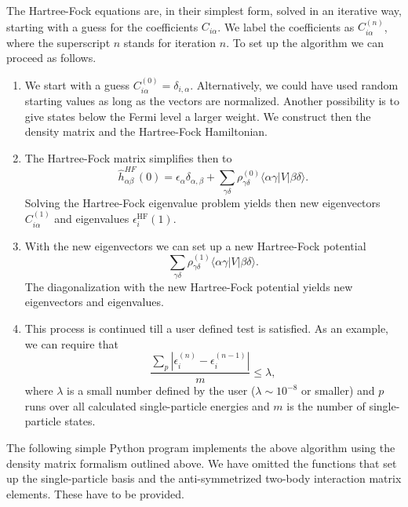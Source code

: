 The Hartree-Fock equations are, in their simplest form, solved in an
iterative way, starting with a guess for the coefficients
$C_{i\alpha}$. We label the coefficients as $C_{i\alpha}^{(n)}$, where
the superscript $n$ stands for iteration $n$.  To set up the algorithm
we can proceed as follows.
\begin{enumerate}
\item We start with a guess
  $C_{i\alpha}^{(0)}=\delta_{i,\alpha}$. Alternatively, we could have
  used random starting values as long as the vectors are
  normalized. Another possibility is to give states below the Fermi
  level a larger weight. We construct then the density matrix and the 
Hartree-Fock Hamiltonian. 
\item The Hartree-Fock matrix simplifies then to
\[
\hat{h}_{\alpha\beta}^{HF}(0)=\epsilon_{\alpha}\delta_{\alpha,\beta}+
\sum_{\gamma\delta} \rho_{\gamma\delta}^{(0)}\langle \alpha\gamma|V|\beta\delta\rangle.
\]
Solving the Hartree-Fock eigenvalue problem yields then new eigenvectors $C_{i\alpha}^{(1)}$ and eigenvalues
$\epsilon_i^{\mathrm{HF}}(1)$. 
\item With the new eigenvectors we can set up a new Hartree-Fock potential 
\[
\sum_{\gamma\delta} \rho_{\gamma\delta}^{(1)}\langle \alpha\gamma|V|\beta\delta\rangle.
\]
The diagonalization with the new Hartree-Fock potential yields new eigenvectors and eigenvalues.
\item This process is continued till a user defined test is
  satisfied. As an example, we can require that
\[
\frac{\sum_{p} |\epsilon_i^{(n)}-\epsilon_i^{(n-1)}|}{m} \le \lambda,
\]
where $\lambda$ is a small number defined by the user ($\lambda \sim
10^{-8}$ or smaller) and $p$ runs over all calculated single-particle
energies and $m$ is the number of single-particle states.

\end{enumerate}
The following simple Python program implements the above algorithm using the density matrix formalism outlined above.
We have omitted the functions that set up the single-particle basis and the anti-symmetrized two-body interaction matrix elements.
These have to be provided. 
